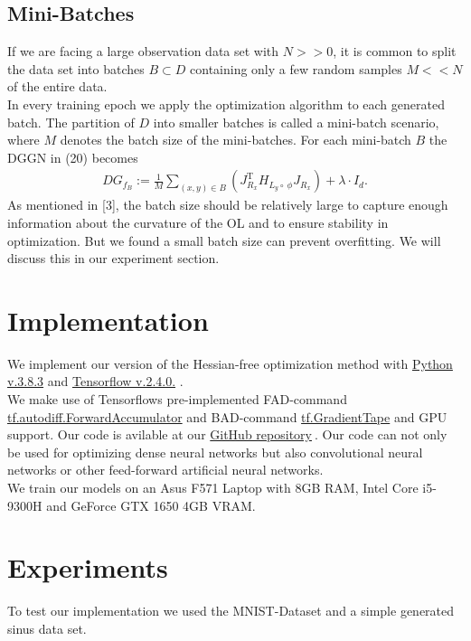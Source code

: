 \documentclass[conference]{IEEEtran}
\begin{document}
	\subsection{Mini-Batches}
	\noindent
	If we are facing a large observation data set with $N>>0$, it is common to split the data set into batches $B\subset D$ containing only a few random samples $M<<N$ of the entire data. \\
	In every training epoch we apply the optimization algorithm to each generated batch. The partition of $D$ into smaller batches is called a mini-batch scenario, where $M$ denotes the batch size of the mini-batches. For each mini-batch $B$ the DGGN in (20) becomes
	\begin{align}
	DG_{f_{B}} := \frac{1}{M}\sum_{(x, y)\in B}^{}\left(J_{R_{x}}^{\mathrm{T}}H_{L_{y}\circ\:\phi}J_{R_{x}}\right) + \lambda\cdot I_{d}.
	\end{align}
	As mentioned in [3], the batch size should be relatively large to capture enough information about the curvature of the OL and to ensure stability in optimization. But we found a small batch size can prevent overfitting. We will discuss this in our experiment section.



	\section {Implementation}
	\noindent
	We implement our version of the Hessian-free optimization method with \href{https://www.python.org/}{Python v.3.8.3} and \href{https://www.tensorflow.org/}{Tensorflow v.2.4.0.} .
	\\We make use of Tensorflows pre-implemented FAD-command \href{https://www.tensorflow.org/api_docs/python/tf/autodiff/ForwardAccumulator}{tf.autodiff.ForwardAccumulator} and BAD-command \href{https://www.tensorflow.org/api_docs/python/tf/GradientTape}{tf.GradientTape} and GPU support. Our code is avilable at our \href{https://github.com/NiklasBrunn/Hessian_Free_Optimization_of_Deep_Neural_Networks}{GitHub repository}$\:$. Our code can not only be used for optimizing dense neural networks but also convolutional neural networks or other feed-forward artificial neural networks.
	\\We train our models on an Asus F571 Laptop with 8GB RAM, Intel Core i5-9300H and GeForce GTX 1650 4GB VRAM.


	\section{Experiments}
	\noindent
	To test our implementation we used the MNIST-Dataset and a simple generated sinus data set.
\end{document}
